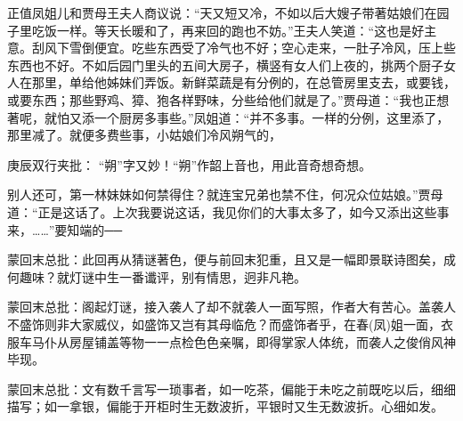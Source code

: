 \begin{parag}


    正值凤姐儿和贾母王夫人商议说：“天又短又冷，不如以后大嫂子带著姑娘们在园子里吃饭一样。等天长暖和了，再来回的跑也不妨。”王夫人笑道：“这也是好主意。刮风下雪倒便宜。吃些东西受了冷气也不好；空心走来，一肚子冷风，压上些东西也不好。不如后园门里头的五间大房子，横竖有女人们上夜的，挑两个厨子女人在那里，单给他姊妹们弄饭。新鲜菜蔬是有分例的，在总管房里支去，或要钱，或要东西；那些野鸡、獐、狍各样野味，分些给他们就是了。”贾母道：“我也正想著呢，就怕又添一个厨房多事些。”凤姐道：“并不多事。一样的分例，这里添了，那里减了。就便多费些事，小姑娘们冷风朔气的，\begin{note}庚辰双行夹批： “朔”字又妙！“朔”作韶上音也，用此音奇想奇想。\end{note}别人还可，第一林妹妹如何禁得住？就连宝兄弟也禁不住，何况众位姑娘。”贾母道：“正是这话了。上次我要说这话，我见你们的大事太多了，如今又添出这些事来，……”要知端的──
\end{parag}

\begin{parag}

    \begin{note}蒙回末总批：此回再从猜谜著色，便与前回末犯重，且又是一幅即景联诗图矣，成何趣味？就灯谜中生一番谶评，别有情思，迥非凡艳。\end{note}
\end{parag}


\begin{parag}


    \begin{note}蒙回末总批：阁起灯谜，接入袭人了却不就袭人一面写照，作者大有苦心。盖袭人不盛饰则非大家威仪，如盛饰又岂有其母临危？而盛饰者乎，在春(凤)姐一面，衣服车马仆从房屋铺盖等物一一点检色色亲嘱，即得掌家人体统，而袭人之俊俏风神毕现。\end{note}
\end{parag}


\begin{parag}


    \begin{note}蒙回末总批：文有数千言写一琐事者，如一吃茶，偏能于未吃之前既吃以后，细细描写；如一拿银，偏能于开柜时生无数波折，平银时又生无数波折。心细如发。\end{note}
\end{parag}
